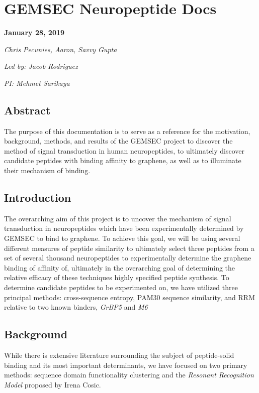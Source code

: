 \documentclass[]{article}
\date{}
\begin{document}
\hypertarget{gemsec-neuropeptide-docs}{%
\section{GEMSEC Neuropeptide Docs}\label{gemsec-neuropeptide-docs}}

\textbf{January 28, 2019}

\emph{Chris Pecunies, Aaron, Savvy Gupta}

\emph{Led by: Jacob Rodriguez}

\emph{PI: Mehmet Sarikaya}

\hypertarget{abstract}{%
\subsection{Abstract}\label{abstract}}

The purpose of this documentation is to serve as a reference for the motivation, background, methods, and results of the GEMSEC project to discover the method of signal transduction in human neuropeptides, to ultimately discover candidate peptides with binding affinity to graphene, as well as to illuminate their mechanism of binding.

\hypertarget{introduction}{%
\subsection{Introduction}\label{introduction}}

The overarching aim of this project is to uncover the mechanism of signal transduction in neuropeptides which have been experimentally determined by GEMSEC to bind to graphene. To achieve this goal, we will be using several different measures of peptide similarity to ultimately select three peptides from a set of several thousand neuropeptides to experimentally determine the graphene binding of affinity of, ultimately in the overarching goal of determining the relative efficacy of these techniques highly specified peptide synthesis. To determine candidate peptides to be experimented on, we have utilized three principal methods: cross-sequence entropy, PAM30 sequence similarity, and RRM relative to two known binders, \emph{GrBP5} and \emph{M6}

\hypertarget{background}{%
\subsection{Background}\label{background}}

While there is extensive literature surrounding the subject of peptide-solid binding and its most important determinants, we have focused on two primary methods: sequence domain functionality clustering and the \emph{Resonant Recognition Model} proposed by Irena Cosic.
\end{document}
